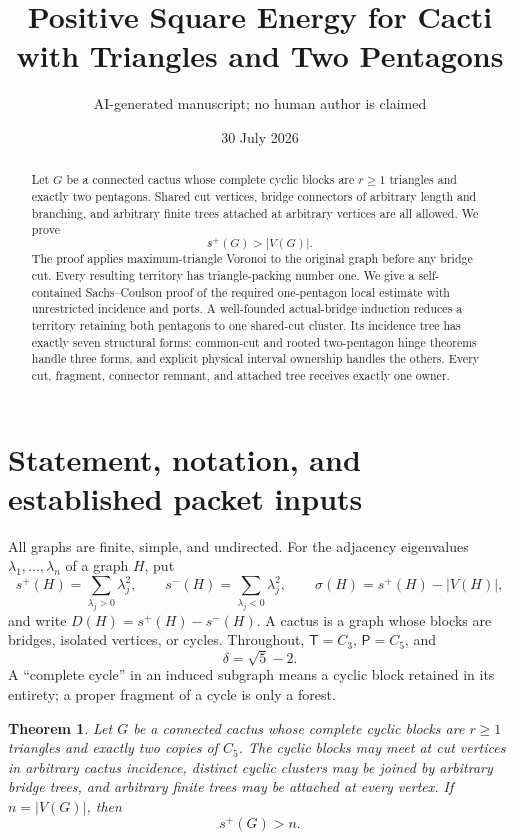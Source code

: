 \documentclass[11pt]{article}
\title{Positive Square Energy for Cacti with Triangles and Two Pentagons}
\author{AI-generated manuscript; no human author is claimed}
\date{30 July 2026}
\newtheorem{theorem}{Theorem}[section]
\theoremstyle{remark}
\newcommand{\splus}{s^+}
\newcommand{\sminus}{s^-}
\newcommand{\sig}{\sigma}
\newcommand{\D}{D}
\newcommand{\T}{\mathsf T}
\newcommand{\Pp}{\mathsf P}
\begin{document}
\maketitle

\begin{abstract}
Let $G$ be a connected cactus whose complete cyclic blocks are $r\geq1$
triangles and exactly two pentagons.  Shared cut vertices, bridge connectors of
arbitrary length and branching, and arbitrary finite trees attached at
arbitrary vertices are all allowed.  We prove
\[
  \splus(G)>|V(G)|.
\]
The proof applies maximum-triangle Voronoi to the original graph before any
bridge cut.  Every resulting territory has triangle-packing number one.  We
give a self-contained Sachs--Coulson proof of the required one-pentagon local
estimate with unrestricted incidence and ports.  A well-founded actual-bridge
induction reduces a territory retaining both pentagons to one shared-cut
cluster.  Its incidence tree has exactly seven structural forms; common-cut
and rooted two-pentagon hinge theorems handle three forms, and explicit
physical interval ownership handles the others.  Every cut, fragment,
connector remnant, and attached tree receives exactly one owner.
\end{abstract}

\section{Statement, notation, and established packet inputs}

All graphs are finite, simple, and undirected.  For the adjacency eigenvalues
$\lambda_1,\ldots,\lambda_n$ of a graph $H$, put
\[
 \splus(H)=\sum_{\lambda_j>0}\lambda_j^2,
 \qquad
 \sminus(H)=\sum_{\lambda_j<0}\lambda_j^2,
 \qquad
 \sig(H)=\splus(H)-|V(H)|,
\]
and write $\D(H)=\splus(H)-\sminus(H)$.  A cactus is a graph whose blocks are
bridges, isolated vertices, or cycles.  Throughout, $\T=C_3$, $\Pp=C_5$, and
\[
 \delta=\sqrt5-2.
\]
A ``complete cycle'' in an induced subgraph means a cyclic block retained in
its entirety; a proper fragment of a cycle is only a forest.

\begin{theorem}\label{thm:main}
Let $G$ be a connected cactus whose complete cyclic blocks are $r\geq1$
triangles and exactly two copies of $C_5$.  The cyclic blocks may meet at cut
vertices in arbitrary cactus incidence, distinct cyclic clusters may be joined
by arbitrary bridge trees, and arbitrary finite trees may be attached at every
vertex.  If $n=|V(G)|$, then
\[
 \boxed{\splus(G)>n}.
\]
\end{theorem}
\end{document}
